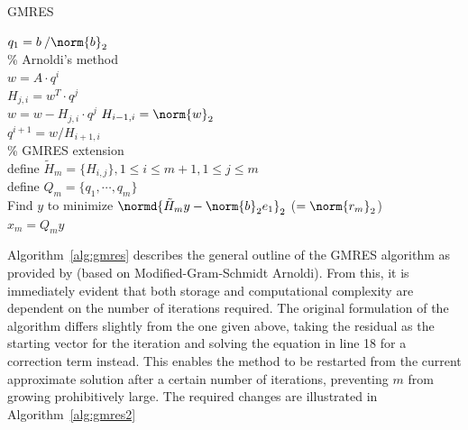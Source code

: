 \begin{algorithm}[h]
  \caption{GMRES}
  \label{alg:gmres}
  \SetAlgoLined
  \DontPrintSemicolon
  $q_1= b\:/\norm{b}_2$ \\
  \% Arnoldi's method \\
   {
    $w =A\cdot q^i$ \\
     {
      $H_{j,i} = w^T\cdot q^j$ \\
      $ w = w - H_{j,i}\cdot q^j$}
    $H_{i-1,i} = \norm{w}_2$ \\
    $q^{i+1} = w/H_{i+1,i}$ \\
  }
  \;
  \% GMRES extension \\
  define $\tilde{H}_m = \{H_{i,j}\}, 1 \leq i \leq m+1, 1 \leq j \leq m$ \\
  define $Q_m = \{q_1, \cdots, q_m\}$ \\
  Find $y$ to minimize $\normd{\tilde{H}_my-\norm{b}_2e_1}_2$ ($=\norm{r_m}_2$) \\
  $x_m = Q_my$
\end{algorithm}

\noindent Algorithm~\hyperref[alg:gmres]{\ref{alg:gmres}} describes the general outline of the GMRES algorithm as provided by \cite{trefethen_numerical_1997} (based on Modified-Gram-Schmidt Arnoldi). From this, it is immediately evident that both storage and computational complexity are dependent on the number of iterations required. The original formulation of the algorithm \cite{saad_gmres_1986} differs slightly from the one given above, taking the residual as the starting vector for the iteration and solving the equation in line 18 for a correction term instead. This enables the method to be restarted from the current approximate solution after a certain number of iterations, preventing $m$ from growing prohibitively large. The required changes are illustrated in Algorithm~\hyperref[alg:gmres2]{\ref{alg:gmres2}}

